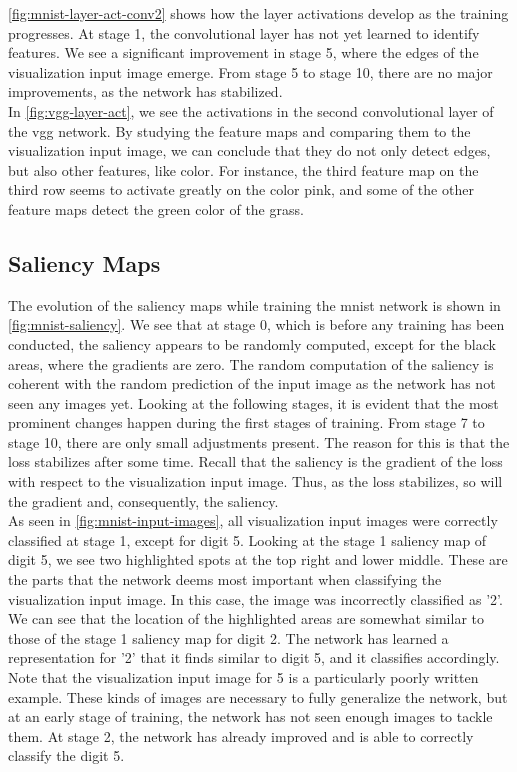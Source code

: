 \noindent \autoref{fig:mnist-layer-act-conv2} shows how the layer activations develop as the training progresses. At stage 1, the convolutional layer has not yet learned to identify features. We see a significant improvement in stage 5, where the edges of the visualization input image emerge. From stage 5 to stage 10, there are no major improvements, as the network has stabilized. \\

\noindent In \autoref{fig:vgg-layer-act}, we see the activations in the second convolutional layer of the \acrshort{vgg} network. By studying the feature maps and comparing them to the visualization input image, we can conclude that they do not only detect edges, but also other features, like color. For instance, the third feature map on the third row seems to activate greatly on the color pink, and some of the other feature maps detect the green color of the grass.

\subsection{Saliency Maps}

The evolution of the saliency maps while training the \acrshort{mnist} network is shown in \autoref{fig:mnist-saliency}. We see that at stage 0, which is before any training has been conducted, the saliency appears to be randomly computed, except for the black areas, where the gradients are zero. The random computation of the saliency is coherent with the random prediction of the input image as the network has not seen any images yet. Looking at the following stages, it is evident that the most prominent changes happen during the first stages of training. From stage 7 to stage 10, there are only small adjustments present. The reason for this is that the loss stabilizes after some time. Recall that the saliency is the gradient of the loss with respect to the visualization input image. Thus, as the loss stabilizes, so will the gradient and, consequently, the saliency. \\

\noindent As seen in \autoref{fig:mnist-input-images}, all visualization input images were correctly classified at stage 1, except for digit 5. Looking at the stage 1 saliency map of digit 5, we see two highlighted spots at the top right and lower middle. These are the parts that the network deems most important when classifying the visualization input image. In this case, the image was incorrectly classified as '2'. We can see that the location of the highlighted areas are somewhat similar to those of the stage 1 saliency map for digit 2. The network has learned a representation for '2' that it finds similar to digit 5, and it classifies accordingly. Note that the visualization input image for 5 is a particularly poorly written example. These kinds of images are necessary to fully generalize the network, but at an early stage of training, the network has not seen enough images to tackle them. At stage 2, the network has already improved and is able to correctly classify the digit 5. \\

